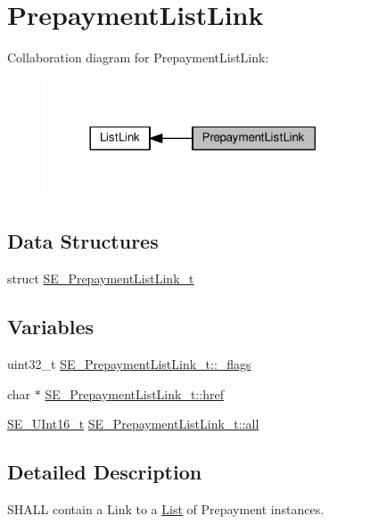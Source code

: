 \hypertarget{group__PrepaymentListLink}{}\section{Prepayment\+List\+Link}
\label{group__PrepaymentListLink}
Collaboration diagram for Prepayment\+List\+Link\+:\nopagebreak
\begin{figure}[H]
\begin{center}
\leavevmode
\includegraphics[width=269pt]{group__PrepaymentListLink}
\end{center}
\end{figure}
\subsection*{Data Structures}
\begin{DoxyCompactItemize}
\item 
struct \hyperlink{structSE__PrepaymentListLink__t}{S\+E\+\_\+\+Prepayment\+List\+Link\+\_\+t}
\end{DoxyCompactItemize}
\subsection*{Variables}
\begin{DoxyCompactItemize}
\item 
uint32\+\_\+t \hyperlink{group__PrepaymentListLink_ga261f83524411826f6b3447e29723d0e1}{S\+E\+\_\+\+Prepayment\+List\+Link\+\_\+t\+::\+\_\+flags}
\item 
char $\ast$ \hyperlink{group__PrepaymentListLink_gaa4762fcd0cb0e237cc9087b4bafef73d}{S\+E\+\_\+\+Prepayment\+List\+Link\+\_\+t\+::href}
\item 
\hyperlink{group__UInt16_gac68d541f189538bfd30cfaa712d20d29}{S\+E\+\_\+\+U\+Int16\+\_\+t} \hyperlink{group__PrepaymentListLink_ga7f7296815f5a0d80f024c5ae2d1561ce}{S\+E\+\_\+\+Prepayment\+List\+Link\+\_\+t\+::all}
\end{DoxyCompactItemize}


\subsection{Detailed Description}
S\+H\+A\+LL contain a Link to a \hyperlink{structList}{List} of Prepayment instances. 

